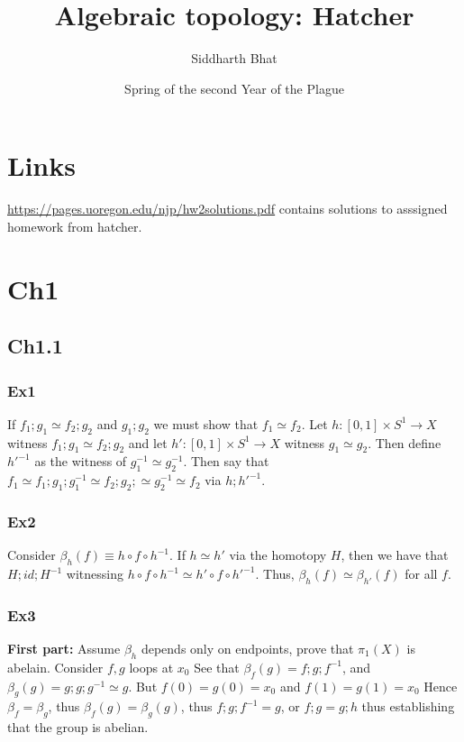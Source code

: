 \documentclass[11pt]{book}
\title{Algebraic topology: Hatcher}
\author{Siddharth Bhat}
\date{Spring of the second Year of the Plague}
\newcommand*{\start}[1]{\leavevmode\newline \textbf{#1} }
\begin{document}
\maketitle
\tableofcontents
\chapter{Links}
\url{https://pages.uoregon.edu/njp/hw2solutions.pdf} contains solutions to asssigned homework from hatcher.
\chapter{Ch1}
\section{Ch1.1}
\subsection{Ex1}
If $f_1 ; g_1 \simeq f_2 ; g_2$ and $g_1 ; g_2$ we must show that $f_1 \simeq f_2$. Let $h: [0, 1] \times S^1 \rightarrow X$
witness $f_1; g_1 \simeq f_2; g_2$ and let $h': [0, 1] \times S^1 \rightarrow X$ witness $g_1 \simeq g_2$. Then
define $h'^{-1}$ as the witness of $g_1^{-1} \simeq g_2^{-1}$. Then say that $f_1 \simeq f_1; g_1; g_1^{-1} \simeq f_2; g_2; \simeq g_2^{-1} \simeq f_2$ via $h; h'^{-1}$.

\subsection{Ex2}
Consider $\beta_h(f) \equiv h \circ f \circ h^{-1}$. If $h \simeq h'$ via the homotopy $H$, then we have that $H; id; H^{-1}$ 
witnessing $h \circ f \circ h^{-1} \simeq h' \circ f \circ h'^{-1}$. Thus, $\beta_h(f) \simeq \beta_{h'}(f)$ for all $f$.

\subsection{Ex3}

\start{First part:} Assume $\beta_h$ depends only on endpoints, prove that $\pi_1(X)$ is abelain. Consider $f, g$ loops at $x_0$
See that $\beta_f(g) = f; g; f^{-1}$, and $\beta_g(g) = g; g; g^{-1} \simeq g$. But $f(0) = g(0) = x_0$ and $f(1) = g(1) = x_0$
Hence $\beta_f = \beta_g$, thus $\beta_f(g) = \beta_g(g)$, thus $f; g; f^{-1} = g$, or $f; g = g; h$ thus establishing
that the group is abelian.
\end{document}
